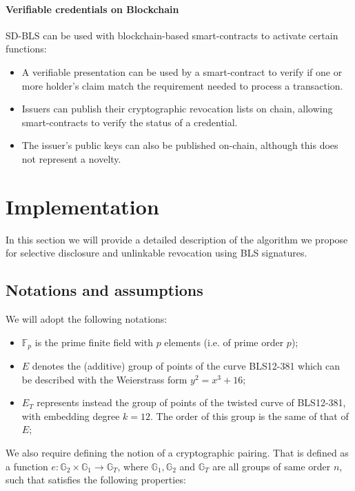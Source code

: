 \paragraph{Verifiable credentials on Blockchain}
SD-BLS can be used with blockchain-based smart-contracts to activate
certain functions:
\begin{itemize}
    \item A verifiable presentation can be used by a smart-contract to
      verify if one or more holder's claim match the requirement
      needed to process a transaction.
    \item Issuers can publish their cryptographic revocation lists on
      chain, allowing smart-contracts to verify the status of a
      credential.
    \item The issuer's public keys can also be published on-chain,
      although this does not represent a novelty.
\end{itemize}

\section{Implementation}

In this section we will provide a detailed description of the
algorithm we propose for selective disclosure and unlinkable
revocation using BLS signatures.

\subsection{Notations and assumptions}

We will adopt the following notations:
\begin{itemize}

\item $\mathbb{F}_p$ is the prime finite field with $p$ elements
  (i.e. of prime order $p$);

\item $E$ denotes the (additive) group of points of the curve
  BLS12-381 \cite{bls381-12} which can be described with the
  Weierstrass form $y^2=x^3 + 16$;

\item $E_T$ represents instead the group of points of the twisted
  curve of BLS12-381, with embedding degree $k=12$. The order of
  this group is the same of that of $E$;

\end{itemize}

We also require defining the notion of a cryptographic
pairing. That is defined as a function $e:
\mathbb{G}_2\times\mathbb{G}_1\to \mathbb{G}_T$, where
$\mathbb{G}_1,\mathbb{G}_2$ and $\mathbb{G}_T$ are all groups of same
order $n$, such that satisfies the following properties:

